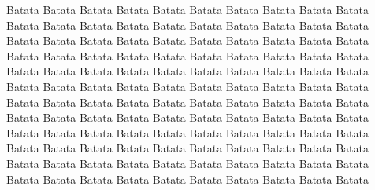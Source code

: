 \begin{flushright}
Batata Batata Batata Batata Batata Batata Batata Batata Batata Batata Batata Batata 
Batata Batata Batata Batata Batata Batata Batata Batata Batata Batata Batata Batata 
Batata Batata Batata Batata Batata Batata Batata Batata Batata Batata Batata Batata 
Batata Batata Batata Batata Batata Batata Batata Batata Batata Batata Batata Batata 
Batata Batata Batata Batata Batata Batata Batata Batata Batata Batata Batata Batata 
Batata Batata Batata Batata Batata Batata Batata Batata Batata Batata Batata Batata 
Batata Batata Batata Batata Batata Batata Batata Batata Batata Batata Batata Batata 
Batata Batata Batata Batata Batata Batata Batata Batata Batata Batata Batata Batata 
Batata Batata Batata Batata Batata Batata Batata Batata Batata Batata Batata Batata 
Batata Batata Batata Batata Batata Batata Batata Batata Batata Batata Batata Batata 

\end{flushright}
